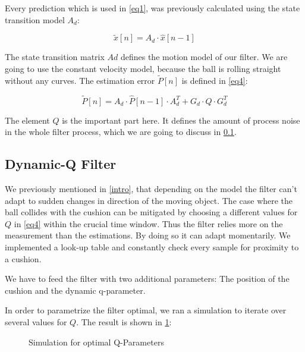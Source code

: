 \documentclass[titlepage, a4paper, 11pt]{scrartcl}
\begin{document}
Every prediction which is used in \cref{eq1}, was previously calculated using the state transition model $A_d$:

\begin{equation} 
    \label{eq3}
    \tilde{x}[n]=A_d\cdot\hat{x}[n-1]
\end{equation}

The state transition matrix $Ad$ defines the motion model of our filter.
We are going to use the constant velocity model, because the ball is rolling straight without any curves.
The estimation error $\tilde{P}[n]$ is defined in \cref{eq4}:

\begin{equation} 
    \label{eq4}
    \tilde{P}[n]=A_d\cdot\hat{P}[n-1]\cdot A_d^T+G_d\cdot Q\cdot G_d^T
\end{equation}

The element $Q$ is the important part here. It defines the amount of process noise in the whole filter process, which we are going to discuss in \cref{dynamic-q}.

\subsection{Dynamic-Q Filter} \label{dynamic-q}

We previously mentioned in \cref{intro}, that depending on the model the filter can't adapt to sudden changes in direction of the moving object. 
The case where the ball collides with the cushion can be mitigated by choosing a different values for $Q$ in \cref{eq4} within the crucial time window.
Thus the filter relies more on the measurement than the estimations. By doing so it can adapt momentarily.
We implemented a look-up table and constantly check every sample for proximity to a cushion.

We have to feed the filter with two additional parameters: The position of the cushion and the dynamic q-parameter.

In order to parametrize the filter optimal, we ran a simulation to iterate over several values for $Q$. The result is shown in \cref{fig:dyn-sim}:

\begin{figure} [H]
    \centering
    \caption{Simulation for optimal Q-Parameters}
    \label{fig:dyn-sim}
\end{figure}
\end{document}
